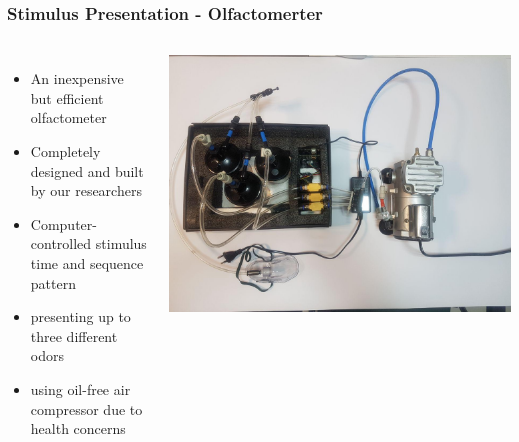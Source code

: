 \documentclass{beamer}
\begin{document}
\begin{frame}
\frametitle{Stimulus Presentation - Olfactomerter}
	\begin{columns}[c] %
		
			\begin{itemize}
			\item
			An inexpensive but efficient olfactometer
			\item
			Completely designed and built by our researchers
			\item
			Computer-controlled stimulus time and sequence pattern
			\item
			presenting up to three different odors
			\item
			using oil-free air compressor due to health concerns
		\end{itemize}
			
				
			\includegraphics[scale=0.2]{olfactometer.jpg}	
		
	\end{columns}
	
\end{frame}
\end{document}
